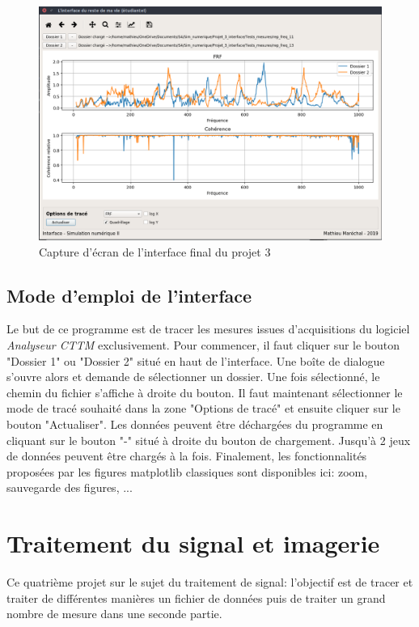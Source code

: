 \documentclass[a4paper,11pt]{article}
\begin{document}
\begin{figure}[H]
	\centering
	\includegraphics[scale=0.3]{Figures/interf_final.png}
	\caption{Capture d'écran de l'interface final du projet 3}
	\label{fig:interf_final}
\end{figure}

\subsection{Mode d'emploi de l'interface}
Le but de ce programme est de tracer les mesures issues d'acquisitions du logiciel \textit{Analyseur CTTM} exclusivement. Pour commencer, il faut cliquer sur le bouton "Dossier 1" ou "Dossier 2" situé en haut de l'interface. Une boîte de dialogue s'ouvre alors et demande de sélectionner un dossier. Une fois sélectionné, le chemin du fichier s'affiche à droite du bouton. Il faut maintenant sélectionner le mode de tracé souhaité dans la zone "Options de tracé" et ensuite cliquer sur le bouton "Actualiser". Les données peuvent être déchargées du programme en cliquant sur le bouton "-" situé à droite du bouton de chargement. Jusqu'à 2 jeux de données peuvent être chargés à la fois. Finalement, les fonctionnalités proposées par les figures matplotlib classiques sont disponibles ici: zoom, sauvegarde des figures, ...





\newpage
\section{Traitement du signal et imagerie}
Ce quatrième projet sur le sujet du traitement de signal: l'objectif est de tracer et traiter de différentes manières un fichier de données puis de traiter un grand nombre de mesure dans une seconde partie. 
\end{document}
